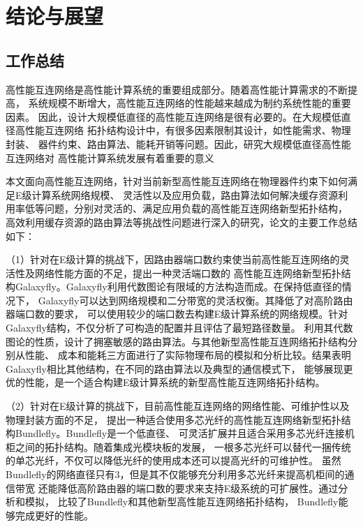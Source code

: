 \chapter{结论与展望}

\section{工作总结}

 高性能互连网络是高性能计算系统的重要组成部分。随着高性能计算需求的不断提高，
 系统规模不断增大，高性能互连网络的性能越来越成为制约系统性能的重要因素。
 因此，设计大规模低直径的高性能互连网络是很有必要的。在大规模低直径高性能互连网络
 拓扑结构设计中，有很多因素限制其设计，如性能需求、物理封装、
 器件约束、路由算法、能耗开销等问题。因此，研究大规模低直径高性能互连网络对
 高性能计算系统发展有着重要的意义

 本文面向高性能互连网络，针对当前新型高性能互连网络在物理器件约束下如何满足E级计算系统网络规模、
灵活性以及应用负载，路由算法如何解决缓存资源利用率低等问题，分别对灵活的、满足应用负载的高性能互连网络新型拓扑结构，
高效利用缓存资源的路由算法等挑战性问题进行深入的研究，论文的主要工作总结如下：

（1）针对在E级计算的挑战下，因路由器端口数约束使当前高性能互连网络的灵活性及网络性能方面的不足，提出一种灵活端口数的
高性能互连网络新型拓扑结构Galaxyfly。Galaxyfly利用代数图论有限域的方法构造而成。在保持低直径的情况下，
Galaxyfly可以达到网络规模和二分带宽的灵活权衡。其降低了对高阶路由器端口数的要求，
可以使用较少的端口数去构建E级计算系统的网络规模。针对Galaxyfly结构，不仅分析了可构造的配置并且评估了最短路径数量。
利用其代数图论的性质，设计了拥塞敏感的路由算法。与其他新型高性能互连网络拓扑结构分别从性能、
成本和能耗三方面进行了实际物理布局的模拟和分析比较。结果表明Galaxyfly相比其他结构，在不同的路由算法以及典型的通信模式下，
能够展现更优的性能，是一个适合构建E级计算系统的新型高性能互连网络拓扑结构。

（2）针对在E级计算的挑战下，目前高性能互连网络的网络性能、可维护性以及物理封装方面的不足，
提出一种适合使用多芯光纤的高性能互连网络新型拓扑结构Bundlefly。Bundlefly是一个低直径、
可灵活扩展并且适合采用多芯光纤连接机柜之间的拓扑结构。随着集成光模块板的发展，
一根多芯光纤可以替代一捆传统的单芯光纤，不仅可以降低光纤的使用成本还可以提高光纤的可维护性。
虽然Bundlefly的网络直径只有3，但是其不仅能够充分利用多芯光纤来提高机柜间的通信带宽
还能降低高阶路由器的端口数的要求来支持E级系统的可扩展性。通过分析和模拟，
比较了Bundlefly和其他新型高性能互连网络拓扑结构，
Bundlefly能够完成更好的性能。

